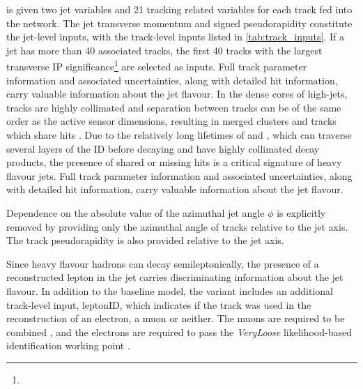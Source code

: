 \GNN is given two jet variables and 21 tracking related variables for each track fed into the network.
The jet transverse momentum and signed pseudorapidity constitute the jet-level inputs, with the track-level inputs listed in \cref{tab:track_inputs}.
If a jet has more than 40 associated tracks, the first 40 tracks with the largest transverse IP significance\footnote{\ipdefsfootnote} \dzerosig are selected as inputs.
Full track parameter information and associated uncertainties, along with detailed hit information, carry valuable information about the jet flavour.
In the dense cores of high-\pt jets, tracks are highly collimated and separation between tracks can be of the same order as the active sensor dimensions, resulting in merged clusters and tracks which share hits \cite{PERF-2015-08}.
Due to the relatively long lifetimes of \bhadrons and \chadrons, which can traverse several layers of the ID before decaying and have highly collimated decay products, the presence of shared or missing hits is a critical signature of heavy flavour jets.
Full track parameter information and associated uncertainties, along with detailed hit information, carry valuable information about the jet flavour.

Dependence on the absolute value of the azimuthal jet angle $\phi$ is explicitly removed by providing only the azimuthal angle of tracks relative to the jet axis. The track pseudorapidity is also provided relative to the jet axis.

Since heavy flavour hadrons can decay semileptonically, the presence of a reconstructed lepton in the jet carries discriminating information about the jet flavour.
In addition to the baseline \GNN model, the \GNNLep variant includes an additional track-level input, leptonID, which indicates if the track was used in the reconstruction of an electron, a muon or neither. %
The muons are required to be combined \cite{ATL-PHYS-PUB-2015-037}, and the electrons are required to pass the \textit{VeryLoose} likelihood-based identification working point \cite{PERF-2017-01}.

